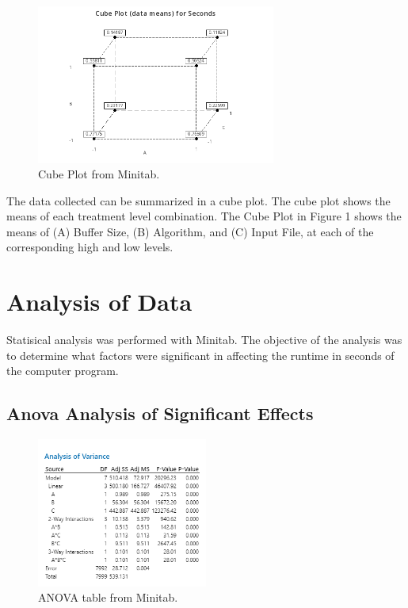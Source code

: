 \documentclass{article}
\begin{document}
\begin{figure}[h] %
  \centering
  \includegraphics[width=0.7\textwidth]{./images/cube.png}
  \caption{Cube Plot from Minitab.}
  \label{fig:interaction}
\end{figure}
The data collected can be summarized in a cube plot.
The cube plot shows the means of each treatment level combination.
The Cube Plot in Figure 1 shows the means of (A) Buffer Size, (B) Algorithm, and (C) Input File, at each of the corresponding high and low levels.

\clearpage
\section*{Analysis of Data}
Statisical analysis was performed with Minitab.
The objective of the analysis was to determine what factors were
significant in affecting the runtime in seconds of the computer program.
\subsection*{Anova Analysis of Significant Effects}
\begin{figure}[h] %
  \centering
  \includegraphics[width=0.5\textwidth]{./images/anova.png}
  \caption{ANOVA table from Minitab.}
  \label{fig:anova}
\end{figure}
\end{document}
